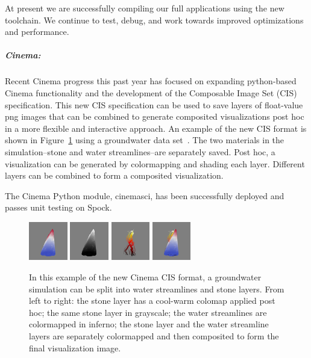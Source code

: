 At present we are successfully compiling our full applications using the new
toolchain.  We continue to test, debug, and work towards improved optimizations
and performance. 

\subparagraph{Cinema:}

Recent Cinema progress this past year has focused on expanding python-based Cinema functionality and the development of the Composable Image Set (CIS) specification. This new CIS specification can be used to save layers of float-value png images that can be combined to generate composited visualizations post hoc in a more flexible and interactive approach.  An example of the new CIS format is shown in Figure~\ref{fig:cinema-cis} using a groundwater data set~\cite{cis:garcia:limestone}.  The two materials in the simulation--stone and water streamlines--are separately saved.  Post hoc, a visualization can be generated by colormapping and shading each layer.  Different layers can be combined to form a composited visualization.

The Cinema Python module, cinemasci, has been successfully deployed and passes unit testing on Spock.

\begin{figure}[htb]
	\centering
	\includegraphics[width=0.15\textwidth]{projects/2.3.6-NNSA/2.3.6.01-LANL-ATDM/cinema-cis-stone-coolwarm.png}
	\includegraphics[width=0.15\textwidth]{projects/2.3.6-NNSA/2.3.6.01-LANL-ATDM/cinema-cis-stone-grayscale.png}
	\includegraphics[width=0.15\textwidth]{projects/2.3.6-NNSA/2.3.6.01-LANL-ATDM/cinema-cis-streamlines.png}
	\includegraphics[width=0.15\textwidth]{projects/2.3.6-NNSA/2.3.6.01-LANL-ATDM/cinema-cis-stone-water.png}
	\caption{
		In this example of the new Cinema CIS format, a groundwater simulation can be split into water streamlines and stone layers.  From left to right: the stone layer has a cool-warm colomap applied post hoc; the same stone layer in grayscale;  the water streamlines are colormapped in inferno;  the stone layer and the water streamline layers are separately colormapped and then composited to form the final visualization image.  
		\label{fig:cinema-cis}
	}
\end{figure}

